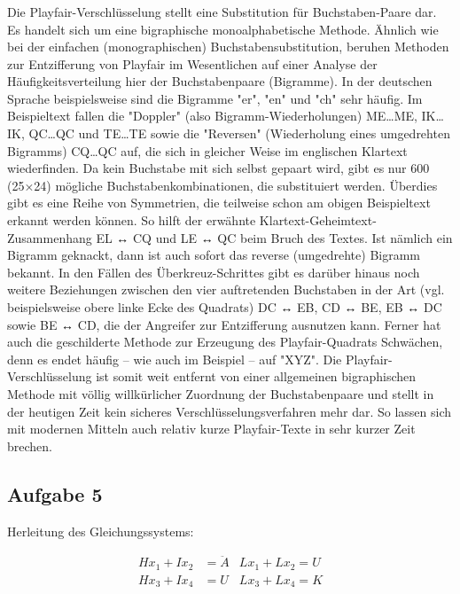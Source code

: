 \subsubsection{}
Die Playfair-Verschlüsselung stellt eine Substitution für Buchstaben-Paare dar. 
Es handelt sich um eine bigraphische monoalphabetische Methode.
 Ähnlich wie bei der einfachen (monographischen) Buchstabensubstitution,
  beruhen Methoden zur Entzifferung von Playfair im Wesentlichen auf einer 
  Analyse der Häufigkeitsverteilung hier der Buchstabenpaare (Bigramme).
   In der deutschen Sprache beispielsweise sind die Bigramme "er", "en" und "ch" sehr häufig. Im Beispieltext fallen die "Doppler" (also Bigramm-Wiederholungen) ME…ME, IK…IK, QC…QC und TE…TE sowie die "Reversen" (Wiederholung eines umgedrehten Bigramms) CQ…QC auf, die sich in gleicher Weise im englischen Klartext wiederfinden.
Da kein Buchstabe mit sich selbst gepaart wird, gibt es nur 600 (25×24) mögliche Buchstabenkombinationen, 
die substituiert werden. Überdies gibt es eine Reihe von Symmetrien, die teilweise schon am obigen Beispieltext erkannt werden können.
So hilft der erwähnte Klartext-Geheimtext-Zusammenhang EL ↔ CQ und LE ↔ QC 
beim Bruch des Textes. Ist nämlich ein Bigramm geknackt, dann ist auch sofort das reverse (umgedrehte) Bigramm bekannt.
In den Fällen des Überkreuz-Schrittes gibt es darüber hinaus noch weitere Beziehungen zwischen den vier auftretenden Buchstaben
 in der Art (vgl. beispielsweise obere linke Ecke des Quadrats) DC ↔ EB, CD ↔ BE, EB ↔ DC sowie BE ↔ CD, die der Angreifer zur
  Entzifferung ausnutzen kann. Ferner hat auch die geschilderte Methode zur Erzeugung des Playfair-Quadrats Schwächen, denn
   es endet häufig – wie auch im Beispiel – auf "XYZ".
Die Playfair-Verschlüsselung ist somit weit entfernt von einer allgemeinen bigraphischen Methode
 mit völlig willkürlicher Zuordnung der Buchstabenpaare und stellt in der heutigen Zeit
  kein sicheres Verschlüsselungsverfahren mehr dar. So lassen sich mit modernen Mitteln
   auch relativ kurze Playfair-Texte in sehr kurzer Zeit brechen.


\subsection{Aufgabe 5}

Herleitung des Gleichungssystems: 

\begin{align}
H x_1+Ix_2 &= \ddot{A}  & Lx_1+Lx_2 = U \\
H x_3+Ix_4 &= U  & Lx_3+Lx_4 = K \\
\end{align}

